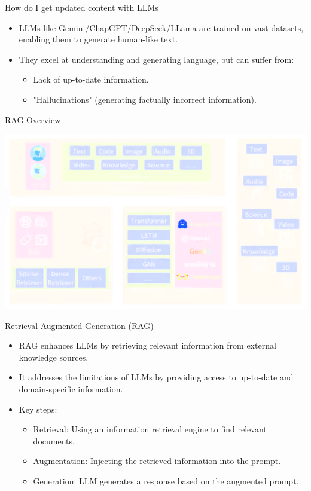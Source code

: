 \begin{frame}{How do I get updated content with LLMs}
  \begin{itemize}
    \item LLMs like Gemini/ChapGPT/DeepSeek/LLama are trained on vast datasets, enabling them to generate human-like text.
    \item They excel at understanding and generating language, but can suffer from:
      \begin{itemize}
        \item Lack of up-to-date information.
        \item "Hallucinations" (generating factually incorrect information).
      \end{itemize}
  \end{itemize}
\end{frame}
\begin{frame}{RAG Overview}
\begin{center}
\includegraphics[width=0.9\linewidth]{Images/RAGOverview}
\end{center}

\end{frame}
\begin{frame}{Retrieval Augmented Generation (RAG)}
  \begin{itemize}
    \item RAG enhances LLMs by retrieving relevant information from external knowledge sources.
    \item It addresses the limitations of LLMs by providing access to up-to-date and domain-specific information.
    \item Key steps:
      \begin{itemize}
        \item Retrieval: Using an information retrieval engine to find relevant documents.
        \item Augmentation: Injecting the retrieved information into the prompt.
        \item Generation: LLM generates a response based on the augmented prompt.
      \end{itemize}
  \end{itemize}
\end{frame}

